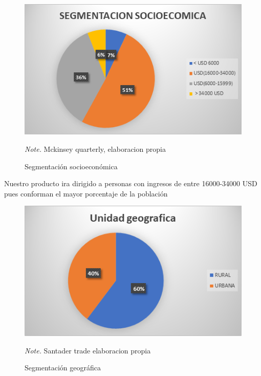 \documentclass[
  stu,
  floatsintext,
  longtable,
  a4paper,
  nolmodern,
  notxfonts,
  notimes,
  colorlinks=true,linkcolor=blue,citecolor=blue,urlcolor=blue]{apa7}
\begin{document}
\begin{figure}[!htbp]

{\caption{{Segmentación socioeconómica}{\label{fig-myimportedimagess}}}}

\includegraphics[width=5in,height=\textheight,keepaspectratio]{index_files/figure-html/figura10.png}

{\noindent \emph{Note.} Mckinsey quarterly, elaboracion propia}

\end{figure}

Nuestro producto ira dirigido a personas con ingresos de entre
16000-34000 USD pues conforman el mayor porcentaje de la población

\begin{figure}[!htbp]

{\caption{{Segmentación geográfica}{\label{fig-myimportedimagesg}}}}

\includegraphics[width=5in,height=\textheight,keepaspectratio]{index_files/figure-html/figura11.png}

{\noindent \emph{Note.} Santader trade elaboracion propia}

\end{figure}
\end{document}
